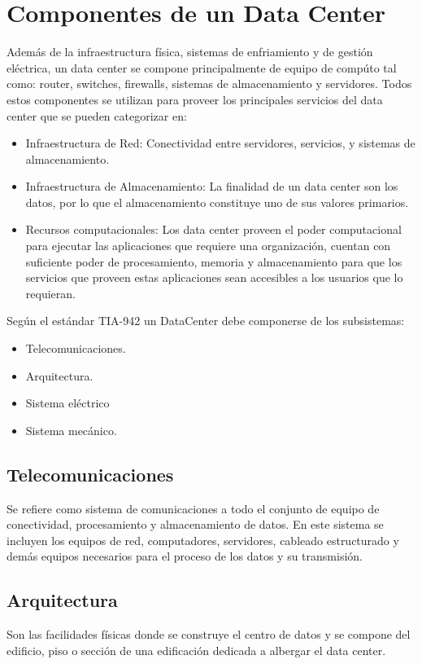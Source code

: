 \documentclass[journal]{IEEEtran}
\begin{document}
\section{Componentes de un Data Center}
Además de la infraestructura física, sistemas de enfriamiento y de gestión eléctrica, un data center se compone principalmente de equipo de compúto tal como:
router, switches, firewalls, sistemas de almacenamiento y servidores.
Todos estos componentes se utilizan para proveer los principales servicios del data center que se pueden categorizar en:
\begin{itemize}
  \item Infraestructura de Red: Conectividad entre servidores, servicios, y sistemas de almacenamiento.
  \item Infraestructura de Almacenamiento: La finalidad de un data center son los datos, por lo que el almacenamiento constituye uno de sus valores primarios.
  \item Recursos computacionales: Los data center proveen el poder computacional para ejecutar las aplicaciones que requiere una organización, cuentan con suficiente poder de procesamiento, memoria y almacenamiento para que 
  los servicios que proveen estas aplicaciones sean accesibles a los usuarios que lo requieran.
\end{itemize}
Según el estándar TIA-942 un DataCenter debe componerse de los subsistemas:
\begin{itemize}
  \item Telecomunicaciones.
  \item Arquitectura.
  \item Sistema eléctrico
  \item Sistema mecánico.
\end{itemize}
\subsection{Telecomunicaciones}
Se refiere como sistema de comunicaciones a todo el conjunto de equipo de conectividad, procesamiento y almacenamiento de datos.
En este sistema se incluyen los equipos de red, computadores, servidores, cableado estructurado y demás equipos necesarios para el proceso de los datos y su transmisión.
\subsection{Arquitectura}
Son las facilidades físicas donde se construye el centro de datos y se compone del edificio, piso o sección de una edificación dedicada
a albergar el data center.
\end{document}
